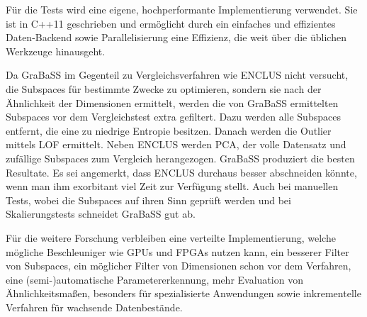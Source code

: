 \documentclass{scrartcl}
\begin{document}
	Für die Tests wird eine eigene, hochperformante Implementierung verwendet. Sie ist in C++11 geschrieben und ermöglicht durch ein einfaches und effizientes Daten-Backend sowie Parallelisierung eine Effizienz, die weit über die üblichen Werkzeuge hinausgeht.

	Da GraBaSS im Gegenteil zu Vergleichsverfahren wie ENCLUS nicht versucht, die Subspaces für bestimmte Zwecke zu optimieren, sondern sie nach der Ähnlichkeit der Dimensionen ermittelt, werden die von GraBaSS ermittelten Subspaces vor dem Vergleichstest extra gefiltert. Dazu werden alle Subspaces entfernt, die eine zu niedrige Entropie besitzen. Danach werden die Outlier mittels LOF ermittelt. Neben ENCLUS werden PCA, der volle Datensatz und zufällige Subspaces zum Vergleich herangezogen. GraBaSS produziert die besten Resultate. Es sei angemerkt, dass ENCLUS durchaus besser abschneiden könnte, wenn man ihm exorbitant viel Zeit zur Verfügung stellt. Auch bei manuellen Tests, wobei die Subspaces auf ihren Sinn geprüft werden und bei Skalierungstests schneidet GraBaSS gut ab.

	Für die weitere Forschung verbleiben eine verteilte Implementierung, welche mögliche Beschleuniger wie GPUs und FPGAs nutzen kann, ein besserer Filter von Subspaces, ein möglicher Filter von Dimensionen schon vor dem Verfahren, eine (semi-)automatische Parametererkennung, mehr Evaluation von Ähnlichkeitsmaßen, besonders für spezialisierte Anwendungen sowie inkrementelle Verfahren für wachsende Datenbestände.
\end{document}
